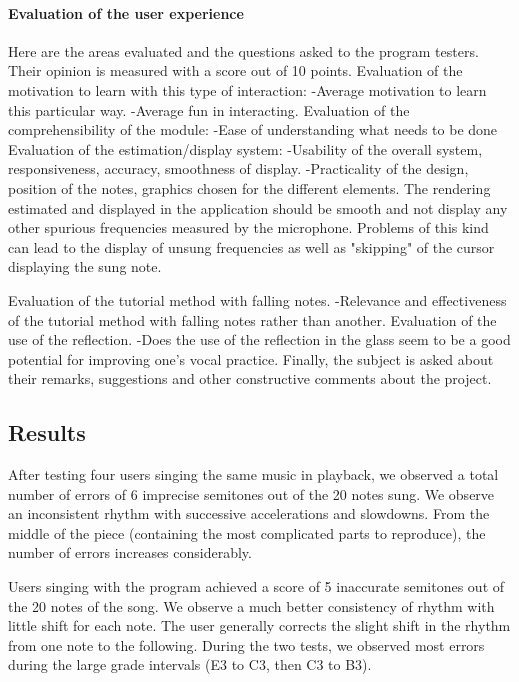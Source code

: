 \paragraph{Evaluation of the user experience}
\label{sec:eval_user_exp}

Here are the areas evaluated and the questions asked to the program testers. Their opinion is measured with a score out of 10 points.
Evaluation of the motivation to learn with this type of interaction: -Average motivation to learn this particular way. -Average fun in interacting.
Evaluation of the comprehensibility of the module: -Ease of understanding what needs to be done Evaluation of the estimation/display system: -Usability of the overall system, responsiveness, accuracy, smoothness of display. -Practicality of the design, position of the notes, graphics chosen for the different elements. The rendering estimated and displayed in the application should be smooth and not display any other spurious frequencies measured by the microphone. Problems of this kind can lead to the display of unsung frequencies as well as "skipping" of the cursor displaying the sung note. 

Evaluation of the tutorial method with falling notes. -Relevance and effectiveness of the tutorial method with falling notes rather than another.
Evaluation of the use of the reflection. -Does the use of the reflection in the glass seem to be a good potential for improving one’s vocal practice. Finally, the subject is asked about their remarks, suggestions and other constructive comments about the project.

\subsection{Results}

After testing four users singing the same music in playback, we observed a total number of errors of 6 imprecise semitones out of the 20 notes sung. We observe an inconsistent rhythm with successive accelerations and slowdowns. From the middle of the piece (containing the most complicated parts to reproduce), the number of errors increases considerably.

Users singing with the program achieved a score of 5 inaccurate semitones out of the 20 notes of the song. We observe a much better consistency of rhythm with little shift for each note. The user generally corrects the slight shift in the rhythm from one note to the following. During the two tests, we observed most errors during the large grade intervals (E3 to C3, then C3 to B3).


